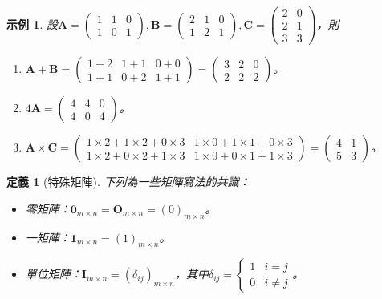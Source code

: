 \documentclass[12pt]{article}
\newtheorem{definition}{定義}
\newtheorem*{example}{示例}
\begin{document}
    \begin{example}
        設$\mathbf{A}=\begin{pmatrix}
            1&1&0\\1&0&1
        \end{pmatrix},\mathbf{B}=\begin{pmatrix}
            2&1&0\\1&2&1
        \end{pmatrix},\mathbf{C}=\begin{pmatrix}
            2&0\\2&1\\3&3
        \end{pmatrix}$，則\begin{enumerate}
            \item $\mathbf{A}+\mathbf{B}=\begin{pmatrix}
                1+2&1+1&0+0\\1+1&0+2&1+1
            \end{pmatrix}=\begin{pmatrix}
                3&2&0\\2&2&2
            \end{pmatrix}$。
            \item $4\mathbf{A}=\begin{pmatrix}
                4&4&0\\4&0&4
            \end{pmatrix}$。
            \item $\mathbf{A}\times\mathbf{C}=\begin{pmatrix}
                1\times2+1\times2+0\times3&1\times0+1\times1+0\times3\\1\times2+0\times2+1\times3&1\times0+0\times1+1\times3
            \end{pmatrix}=\begin{pmatrix}
                4&1\\5&3
            \end{pmatrix}$。
        \end{enumerate}
    \end{example}

    \begin{definition}[特殊矩陣]
        下列為一些矩陣寫法的共識：\begin{itemize}
            \item 零矩陣：$\mathbf{0}_{m\times n}=\mathbf{O}_{m\times n}=(0)_{m\times n}$。
            \item 一矩陣：$\mathbf{1}_{m\times n}=(1)_{m\times n}$。
            \item 單位矩陣：$\mathbf{I}_{m\times n}=(\delta_{ij})_{m\times n}$，其中$\delta_{ij}=\begin{cases}
                1 & i=j\\ 0 & i\neq j
            \end{cases}$。
        \end{itemize}
    \end{definition}
\end{document}
